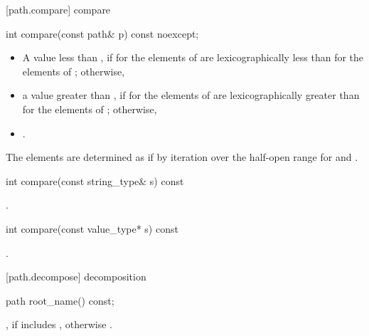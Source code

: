 [path.compare]{ compare}

\begin{itemdecl}
int compare(const path& p) const noexcept;
\end{itemdecl}

\begin{itemdescr}
\pnum
\returns
 \begin{itemize}
\item A value less than ,
  if  for the elements of 
  are lexicographically less than  for the elements of ;
  otherwise,
\item a value greater than ,
  if  for the elements of 
  are lexicographically greater than  for the elements of ;
  otherwise,
\item {}.
 \end{itemize}

\pnum
\remarks The elements are determined as if by iteration over the half-open
range  for  and .
\end{itemdescr}

\begin{itemdecl}
int compare(const string_type& s) const
\end{itemdecl}

\begin{itemdescr}
\pnum
\returns {}.
\end{itemdescr}

\begin{itemdecl}
int compare(const value_type* s) const
\end{itemdecl}

\begin{itemdescr}
\pnum
\returns {}.
\end{itemdescr}

[path.decompose]{ decomposition}

\begin{itemdecl}
path root_name() const;
\end{itemdecl}

\begin{itemdescr}
\pnum
\returns {}, if  includes , otherwise .
\end{itemdescr}

